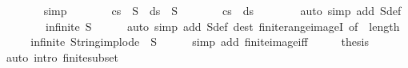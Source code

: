 \begin{isabellebody}
\ \ \ \ \ \ \isamarkupfalse%
\ simp\isanewline
\ \ \ \ \isamarkupfalse%
\ \isamarkupfalse%
\ {\isachardoublequoteopen}cs\ {\isasymin}\ S{\isachardoublequoteclose}\ \ {\isachardoublequoteopen}ds\ {\isasymin}\ S{\isachardoublequoteclose}\isanewline
\ \ \ \ \isamarkupfalse%
\ \isamarkupfalse%
\ {\isachardoublequoteopen}cs\ {\isacharequal}{\kern0pt}\ ds{\isachardoublequoteclose}\isanewline
\ \ \ \ \ \ \isamarkupfalse%
\ {\isacharparenleft}{\kern0pt}auto\ simp\ add{\isacharcolon}{\kern0pt}\ S{\isacharunderscore}{\kern0pt}def{\isacharparenright}{\kern0pt}\isanewline
\ \ \isamarkupfalse%
\isanewline
\ \ \isamarkupfalse%
\ \isamarkupfalse%
\ {\isachardoublequoteopen}infinite\ S{\isachardoublequoteclose}\isanewline
\ \ \ \ \isamarkupfalse%
\ {\isacharparenleft}{\kern0pt}auto\ simp\ add{\isacharcolon}{\kern0pt}\ S{\isacharunderscore}{\kern0pt}def\ dest{\isacharcolon}{\kern0pt}\ finite{\isacharunderscore}{\kern0pt}range{\isacharunderscore}{\kern0pt}imageI\ {\isacharbrackleft}{\kern0pt}of\ {\isacharunderscore}{\kern0pt}\ length{\isacharbrackright}{\kern0pt}{\isacharparenright}{\kern0pt}\isanewline
\ \ \isamarkupfalse%
\ \isamarkupfalse%
\ {\isachardoublequoteopen}infinite\ {\isacharparenleft}{\kern0pt}String{\isachardot}{\kern0pt}implode\ {\isacharbackquote}{\kern0pt}\ S{\isacharparenright}{\kern0pt}{\isachardoublequoteclose}\isanewline
\ \ \ \ \isamarkupfalse%
\ {\isacharparenleft}{\kern0pt}simp\ add{\isacharcolon}{\kern0pt}\ finite{\isacharunderscore}{\kern0pt}image{\isacharunderscore}{\kern0pt}iff{\isacharparenright}{\kern0pt}\isanewline
\ \ \isamarkupfalse%
\ \isamarkupfalse%
\ {\isacharquery}{\kern0pt}thesis\isanewline
\ \ \ \ \isamarkupfalse%
\ {\isacharparenleft}{\kern0pt}auto\ intro{\isacharcolon}{\kern0pt}\ finite{\isacharunderscore}{\kern0pt}subset{\isacharparenright}{\kern0pt}\isanewline
{}\isamarkupfalse%
%
\endisatagproof
{\isafoldproof}%
%
\isadelimproof
%
\endisadelimproof
%
\isadelimdocument
%
\endisadelimdocument
%
\isatagdocument
%
\isamarkuptrue%
%
\endisatagdocument
{\isafolddocument}%
%
\isadelimdocument
%
\endisadelimdocument
{}\isamarkupfalse%
\isanewline
{}\isanewline
\isanewline
{}\ \isamarkupfalse%

\end{isabellebody}
